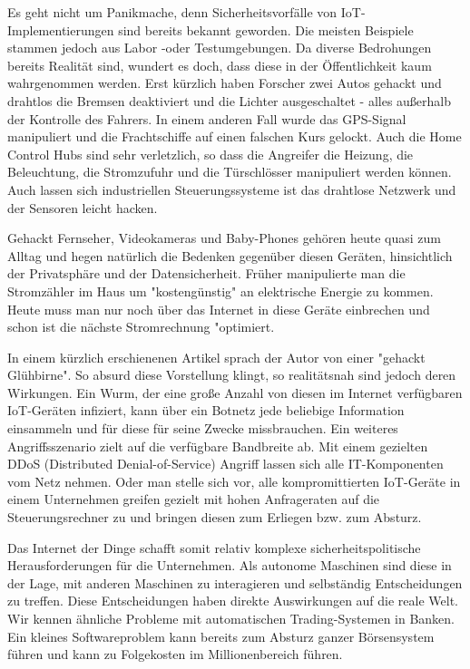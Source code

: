 Es geht nicht um Panikmache, denn Sicherheitsvorfälle von IoT-Implementierungen sind bereits bekannt geworden. Die meisten Beispiele stammen jedoch aus Labor -oder Testumgebungen. Da diverse Bedrohungen bereits Realität sind, wundert es doch, dass diese in der Öffentlichkeit kaum wahrgenommen werden. Erst kürzlich haben Forscher zwei Autos gehackt und drahtlos die Bremsen deaktiviert und die Lichter ausgeschaltet - alles außerhalb der Kontrolle des Fahrers. In einem anderen Fall wurde das GPS-Signal manipuliert und die Frachtschiffe auf einen falschen Kurs gelockt. Auch die Home Control Hubs sind sehr verletzlich, so dass die Angreifer die Heizung, die Beleuchtung, die Stromzufuhr und die Türschlösser manipuliert werden können. Auch lassen sich industriellen Steuerungssysteme ist das drahtlose Netzwerk und der Sensoren leicht hacken.

Gehackt Fernseher, Videokameras und Baby-Phones gehören heute quasi zum Alltag und hegen natürlich die Bedenken gegenüber diesen Geräten, hinsichtlich der Privatsphäre und der Datensicherheit. Früher manipulierte man die Stromzähler im Haus um "kostengünstig" an elektrische Energie zu kommen. Heute muss man nur noch über das Internet in diese Geräte einbrechen und schon ist die nächste Stromrechnung "optimiert.

In einem kürzlich erschienenen Artikel sprach der Autor von einer "gehackt Glühbirne".  So absurd diese Vorstellung klingt, so realitätsnah sind jedoch deren Wirkungen. Ein Wurm, der eine große Anzahl von diesen im Internet verfügbaren IoT-Geräten infiziert, kann über ein Botnetz jede beliebige Information einsammeln und für diese für seine Zwecke missbrauchen. Ein weiteres Angriffsszenario zielt auf die verfügbare Bandbreite ab. Mit einem gezielten DDoS (Distributed Denial-of-Service) Angriff lassen sich alle IT-Komponenten vom Netz nehmen. Oder man stelle sich vor, alle kompromittierten IoT-Geräte in einem Unternehmen greifen gezielt mit hohen Anfrageraten auf die Steuerungsrechner zu und bringen diesen zum Erliegen bzw. zum Absturz.

Das Internet der Dinge schafft somit relativ komplexe sicherheitspolitische Herausforderungen für die Unternehmen. Als autonome Maschinen sind diese in der Lage, mit anderen Maschinen zu interagieren und selbständig Entscheidungen zu treffen. Diese Entscheidungen haben direkte Auswirkungen auf die reale Welt. Wir kennen ähnliche Probleme mit automatischen Trading-Systemen in Banken. Ein kleines Softwareproblem kann bereits zum Absturz ganzer Börsensystem führen und kann zu Folgekosten im Millionenbereich führen.

